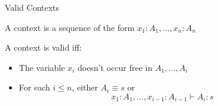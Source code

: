\documentclass{beamer}
\newcommand{\oftype}[2]{#1\!:\!#2}
\begin{document}
\begin{frame}{Valid Contexts}

  A context is a sequence of the form $\oftype{x_1}{A_1}, \ldots, \oftype{x_n}{A_n}$

  \smallskip

  A context is valid iff:

  \begin{itemize}
    \item
      The variable $x_i$ doesn't occur free in $A_1, \ldots, A_i$
    \item
      For each $i \leq n$, either $A_i \equiv s$ or
        \begin{equation*}
          \oftype{x_1}{A_1}, \ldots, \oftype{x_{i-1}}{A_{i-1}} \vdash \oftype{A_i}{s}
        \end{equation*}
  \end{itemize}

\end{frame}

\newcommand{\vcdash}{\vdash_{vc}}
\newcommand{\vtdash}{\vdash_{vt}}
\end{document}
